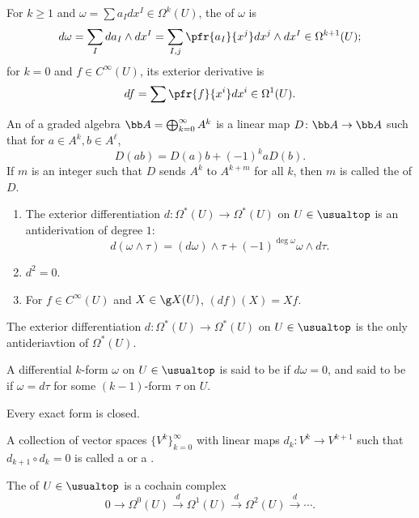 For $k \ge 1$ and $\omega = \sum a_I dx^I \in \Omega^k(U)$, the  of $\omega$ is
\[
d\omega = \sum_I da_I \wedge dx^I = \sum_{I,j} \pfr{a_I}{x^j} dx^j \wedge dx^I \in \Omega^{k+1}(U);
\]
for $k = 0$ and $f \in C^\infty(U)$, its exterior derivative is
\[
df = \sum \pfr{f}{x^i} dx^i\in \Omega^1 (U).
\]

An  of a graded algebra $\bb A = \bigoplus_{k=0}^\infty A^k$ is a linear map $D \colon \bb A \to \bb A$ such that for $a \in A^k, b \in A^\ell$,
\[
D(ab) = D(a)b + (-1)^k aD(b).
\]
If $m$ is an integer such that $D$ sends $A^k$ to $A^{k+m}$ for all $k$, then $m$ is called the  of $D$.

\begin{enumerate}
\item The exterior differentiation $d \colon \Omega^*(U) \to \Omega^*(U)$ on $U \in \usualtop$ is an antiderivation of degree $1$:
\[
d(\omega \wedge \tau) = (d\omega)\wedge \tau + (-1)^{\deg \omega} \omega \wedge d \tau.
\]
\item $d^2 = 0$.
\item For $f \in C^\infty(U)$ and $X \in \g X(U)$, $(df)(X) = Xf$.
\end{enumerate}

The exterior differentiation $d \colon \Omega^*(U) \to \Omega^*(U)$ on $U \in \usualtop$ is the only antideriavtion of $\Omega^*(U)$.

A differential $k$-form $\omega$ on $U \in \usualtop$ is said to be  if $d\omega = 0$, and said to be  if $\omega = d \tau$ for some $(k-1)$-form $\tau$ on $U$.

Every exact form is closed.

A collection of vector spaces $\{ V^k \}_{k=0}^\infty$ with linear maps $d_k \colon V^k \to V^{k+1}$ such that $d_{k+1} \circ d_k = 0$ is called a  or a .

The  of $U \in \usualtop$ is a cochain complex
\[
0 \rightarrow \Omega^0 (U) \xrightarrow{d} \Omega^1(U) \xrightarrow{d} \Omega^2 (U) \xrightarrow{d} \cdots.
\]

